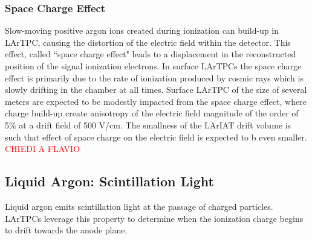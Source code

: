 \subsubsection{Space Charge Effect}
Slow-moving positive argon ions created during ionization can build-up in LArTPC, causing the distortion of the
electric field within the detector. This effect, called  ``space charge effect" leads to a displacement in the reconstructed position of the signal ionization electrons. In surface LArTPCs the space charge effect is primarily due to the rate of ionization produced by cosmic rays which is slowly drifting in the chamber at all times. Surface LArTPC of the size of several meters are expected to be modestly impacted from the space charge effect, where charge build-up create anisotropy of the electric field magnitude of the order of  5\% at a drift field of 500 V/cm. The smallness of the LArIAT drift volume is such that  effect of  space charge on the electric field is expected to b even smaller. \textcolor{red}{CHIEDI A FLAVIO}

\subsection{Liquid Argon: Scintillation Light }\label{sec:light}
Liquid argon emits scintillation light at the passage of charged particles. LArTPCs  leverage this property to determine when the ionization charge begins to drift towards the anode plane. %

